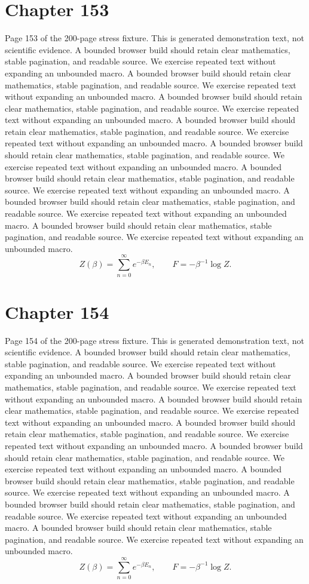 \documentclass[11pt]{article}
\begin{document}
\section*{Chapter 153}
Page 153 of the 200-page stress fixture. This is generated demonstration text, not scientific evidence.
A bounded browser build should retain clear mathematics, stable pagination, and readable source. We exercise repeated text without expanding an unbounded macro.
A bounded browser build should retain clear mathematics, stable pagination, and readable source. We exercise repeated text without expanding an unbounded macro.
A bounded browser build should retain clear mathematics, stable pagination, and readable source. We exercise repeated text without expanding an unbounded macro.
A bounded browser build should retain clear mathematics, stable pagination, and readable source. We exercise repeated text without expanding an unbounded macro.
A bounded browser build should retain clear mathematics, stable pagination, and readable source. We exercise repeated text without expanding an unbounded macro.
A bounded browser build should retain clear mathematics, stable pagination, and readable source. We exercise repeated text without expanding an unbounded macro.
A bounded browser build should retain clear mathematics, stable pagination, and readable source. We exercise repeated text without expanding an unbounded macro.
A bounded browser build should retain clear mathematics, stable pagination, and readable source. We exercise repeated text without expanding an unbounded macro.
\[Z(\beta)=\sum_{n=0}^{\infty}e^{-\beta E_n},\qquad F=-\beta^{-1}\log Z.\]
\newpage
\section*{Chapter 154}
Page 154 of the 200-page stress fixture. This is generated demonstration text, not scientific evidence.
A bounded browser build should retain clear mathematics, stable pagination, and readable source. We exercise repeated text without expanding an unbounded macro.
A bounded browser build should retain clear mathematics, stable pagination, and readable source. We exercise repeated text without expanding an unbounded macro.
A bounded browser build should retain clear mathematics, stable pagination, and readable source. We exercise repeated text without expanding an unbounded macro.
A bounded browser build should retain clear mathematics, stable pagination, and readable source. We exercise repeated text without expanding an unbounded macro.
A bounded browser build should retain clear mathematics, stable pagination, and readable source. We exercise repeated text without expanding an unbounded macro.
A bounded browser build should retain clear mathematics, stable pagination, and readable source. We exercise repeated text without expanding an unbounded macro.
A bounded browser build should retain clear mathematics, stable pagination, and readable source. We exercise repeated text without expanding an unbounded macro.
A bounded browser build should retain clear mathematics, stable pagination, and readable source. We exercise repeated text without expanding an unbounded macro.
\[Z(\beta)=\sum_{n=0}^{\infty}e^{-\beta E_n},\qquad F=-\beta^{-1}\log Z.\]
\newpage
\end{document}
